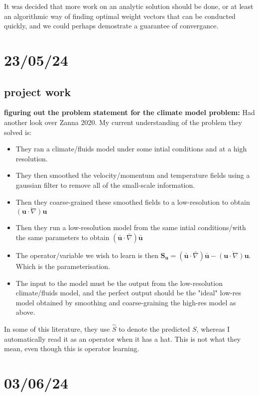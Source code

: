 \documentclass[11pt,a4paper]{article}
\begin{document}
It was decided that more work on an analytic solution should be done, or at least an algorithmic way of finding optimal weight vectors that can be conducted quickly, and we could perhaps demostrate a guarantee of convergance.

\section{23/05/24}

\subsection{project work}

\textbf{figuring out the problem statement for the climate model problem:}
Had another look over Zanna 2020.
My current understanding of the problem they solved is:
\begin{itemize}
  \item They ran a climate/fluids model under some intial conditions and at a high resolution.
  \item They then smoothed the velocity/momentum and temperature fields using a gaussian filter to remove all of the small-scale information.
  \item Then they coarse-grained these smoothed fields to a low-resolution to obtain $\overline{(\mathbf{u}\cdot \nabla)\mathbf{u}}$
  \item Then they run a low-resolution model from the same intial conditions/with the same parameters to obtain $(\bar{\mathbf{u}}\cdot \bar{\nabla})\bar{\mathbf{u}}$
  \item The operator/variable we wish to learn is then $\mathbf{S_u} = (\bar{\mathbf{u}}\cdot \bar{\nabla})\bar{\mathbf{u}} - \overline{(\mathbf{u}\cdot \nabla)\mathbf{u}}$. Which is the parameterisation.
  \item The input to the model must be the output from the low-resolution climate/fluids model, and the perfect output should be the "ideal" low-res model obtained by smoothing and coarse-graining the high-res model as above.
\end{itemize}

In some of this literature, they use $\hat{S}$ to denote the predicted $S$, whereas I automatically read it as an operator when it has a hat.
This is not what they mean, even though this is operator learning.

\section{03/06/24}
\end{document}
